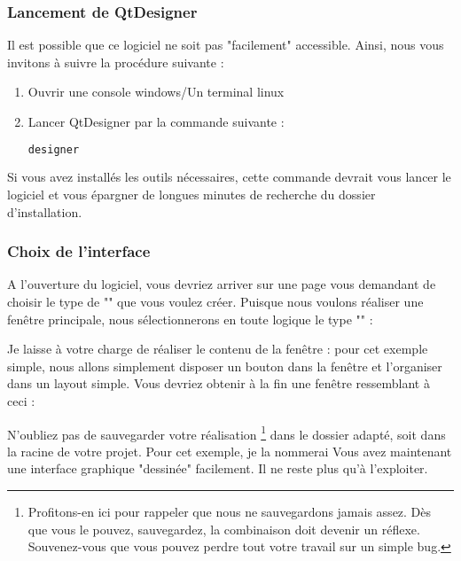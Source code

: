 \subsubsection{Lancement de QtDesigner}

Il est possible que ce logiciel ne soit pas "facilement" accessible. Ainsi, nous vous invitons à suivre la procédure suivante :
\begin{enumerate}
\item Ouvrir une console windows/Un terminal linux
\item Lancer QtDesigner par la commande suivante :
\begin{lstlisting}[language=bash]
designer
\end{lstlisting}
\end{enumerate}

Si vous avez installés les outils nécessaires, cette commande devrait vous lancer le logiciel et vous épargner de longues minutes de recherche du dossier d'installation.

\subsubsection{Choix de l'interface}

A l'ouverture du logiciel, vous devriez arriver sur une page vous demandant de choisir le type de "" que vous voulez créer.\newline
Puisque nous voulons réaliser une fenêtre principale, nous sélectionnerons en toute logique le type "" :


Je laisse à votre charge de réaliser le contenu de la fenêtre : pour cet exemple simple, nous allons simplement disposer un bouton dans la fenêtre et l'organiser dans un layout simple.\newline
Vous devriez obtenir à la fin une fenêtre ressemblant à ceci :


N'oubliez pas de sauvegarder votre réalisation
\footnote{Profitons-en ici pour rappeler que nous ne sauvegardons jamais assez. Dès que vous le pouvez, sauvegardez, la combinaison  doit devenir un réflexe. Souvenez-vous que vous pouvez perdre tout votre travail sur un simple bug.}
dans le dossier adapté, soit  dans la racine de votre projet. Pour cet exemple, je la nommerai \newline
Vous avez maintenant une interface graphique "dessinée" facilement. Il ne reste plus qu'à l'exploiter.


